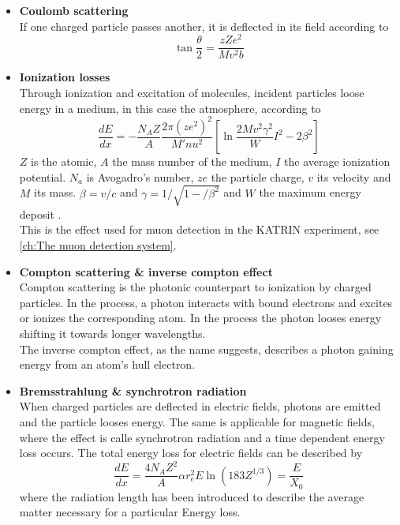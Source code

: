 \begin{itemize}
	
	\begin{itemize}
		\item {\bf Coulomb scattering}\\
		If one charged particle passes another, it is deflected in its field according to
		\begin{equation}
			\tan{\frac{\theta}{2}} = \frac{zZe^2}{Mv^2b}
		\end{equation}
		\item{\bf Ionization losses}\\
		Through ionization and excitation of molecules, incident particles loose energy in a medium, in this case the atmosphere, according to
		\begin{equation}
			\frac{dE}{dx} = -\frac{N_AZ}{A}\frac{2\pi\left(ze^2\right)^2}{M'nu^2}\left[\ln{\frac{2Mv^2\gamma^2}W{I^2}}-2\beta^2\right]
		\end{equation}
		$Z$ is the atomic, $A$ the mass number of the medium, $I$ the average ionization potential. $N_a$ is Avogadro's number, $ze$ the particle charge, $v$ its velocity and $M$ its mass. $\beta = v/c$ and $\gamma = 1/\sqrt{1-/\beta^2}$ and $W$ the maximum energy deposit \cite{Hayakawa}.\\
		This is the effect used for muon detection in the KATRIN experiment, see \ref{ch:The muon detection system}.
		
		\item{\bf Compton scattering \& inverse compton effect}\\
		Compton scattering is the photonic counterpart to ionization by charged particles. In the process, a photon interacts with bound electrons and excites or ionizes the corresponding atom. In the process the photon looses energy shifting it towards longer wavelengths.\\
		The inverse compton effect, as the name suggests, describes a photon gaining energy from an atom's hull electron.
		
		\item{\bf Bremsstrahlung \& synchrotron radiation}\\
		When charged particles are deflected in electric fields, photons are emitted and the particle looses energy. The same is applicable for magnetic fields, where the effect is calle synchrotron radiation and a time dependent energy loss occurs. The total energy loss for electric fields can be described by
		\begin{equation}
			\frac{dE}{dx} = \frac{4N_AZ^2}{A}\alpha r_e^2 E  \ln{\left(183 Z^{1/3}\right)} = \frac{E}{X_0}
		\end{equation}
		where the radiation length has been introduced to describe the average matter necessary for a particular Energy loss.
		

\end{itemize}
\end{itemize}
